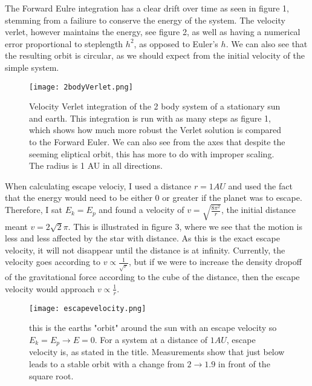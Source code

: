 \documentclass[10pt, twocolumn]{revtex4-1}
\begin{document}
The Forward Eulre integration has a clear drift over time as seen in figure 1, stemming from a failiure to conserve the energy of the system. 
The velocity verlet, however maintains the energy, see figure 2, as well as having a numerical error proportional to steplength $h^2$, as 
opposed to Euler's $h$. We can also see that the resulting orbit is circular, as we should expect from the initial velocity of the simple system. 


\begin{figure}[hbtp]
    \texttt{[image: 2bodyVerlet.png]}
    \caption{Velocity Verlet integration of the 2 body system of a stationary sun and earth.
        This integration is run with as many steps as figure 1, which shows how much more robust
        the Verlet solution is compared to the Forward Euler. We can also see from the axes that 
        despite the seeming eliptical orbit, this has more to do with improper scaling. The radius
        is 1 AU in all directions. } 
    \label{}
\end{figure}

When calculating escape velociy, I used a distance $r= 1AU$ and used the fact that the energy would need to be either $0$
or greater if the planet was to escape. Therefore, I sat $E_k = E_p$ and found a velocity of $v = \sqrt{\frac{8\pi^2}{r}}$,
the initial distance meant $v = 2\sqrt{2}\pi$. This is illustrated in figure 3, where we see that the motion is less and 
less affected by the star with distance. As this is the exact escape velocity, it will not disappear until the distance is at 
infinity. Currently, the velocity goes according to $v \propto \frac{1}{\sqrt{r}}$, but if we were to increase the density
dropoff of the gravitational force according to the cube of the distance, then the escape velocity would approach 
$v \propto \frac{1}{r}$.
\begin{figure}[hbtp]
    \texttt{[image: escapevelocity.png]}
    \caption{this is the earths "orbit" around the sun with an escape velocity so $E_k = E_p \rightarrow E=0$.
        For a system at a distance of $1 AU$, escape velocity is, as stated in the title. Measurements show that 
        just below leads to a stable orbit with a change from $2 \rightarrow 1.9$ in front of the square root.} 
    \label{}
\end{figure}
\end{document}

